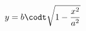 \documentclass[preview]{standalone}
\begin{document}
\begin{align*}
y=b \codt \sqrt{1 - \frac{x^2}{a^2}}
\end{align*}
\end{document}

